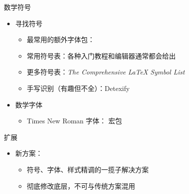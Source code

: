 \begin{frame}[fragile]{数学符号}
  \begin{itemize}
    \item 寻找符号
          \begin{itemize}
            \item 最常用的额外字体包：
            \item 常用符号表：各种入门教程和编辑器通常都会给出
            \item 更多符号表：\textit{The Comprehensive \LaTeX{} Symbol List}
            \item 手写识别（有趣但不全）：Detexify 
          \end{itemize}
    \item 数学字体
          \begin{itemize}
            \item Times New Roman 字体： 宏包
          \end{itemize}
  \end{itemize}
  \vspace{-1em}
  \begin{block}{扩展}
    \begin{itemize}
      \item 新方案：
            \begin{itemize}
              \item 符号、字体、样式精调的一揽子解决方案
              \item 彻底修改底层，不可与传统方案混用
            \end{itemize}
    \end{itemize}
  \end{block}
\end{frame}

